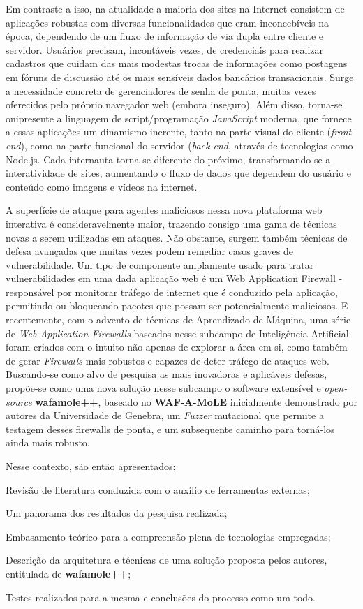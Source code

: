 Em contraste a isso, na atualidade a maioria dos sites na Internet consistem de aplicações robustas com diversas funcionalidades que eram inconcebíveis na época, dependendo de um fluxo de informação de via dupla entre cliente e servidor. Usuários precisam, incontáveis vezes, de credenciais para realizar cadastros que cuidam das mais modestas trocas de informações como postagens em fóruns de discussão até os mais sensíveis dados bancários transacionais. Surge a necessidade concreta de gerenciadores de senha de ponta, muitas vezes oferecidos pelo próprio navegador web (embora inseguro). Além disso, torna-se onipresente a linguagem de script/programação \textit{JavaScript} moderna, que fornece a essas aplicações um dinamismo inerente, tanto na parte visual do cliente (\textit{front-end}), como na parte funcional do servidor (\textit{back-end}, através de tecnologias como Node.js. Cada internauta torna-se diferente do próximo, transformando-se a interatividade de sites, aumentando o fluxo de dados que dependem do usuário e conteúdo como imagens e vídeos na internet.

A superfície de ataque para agentes maliciosos nessa nova plataforma web interativa é consideravelmente maior, trazendo consigo uma gama de técnicas novas a serem utilizadas em ataques. Não obstante, surgem também técnicas de defesa avançadas que muitas vezes podem remediar casos graves de vulnerabilidade. Um tipo de componente amplamente usado para tratar vulnerabilidades em uma dada aplicação web é um Web Application Firewall - responsável por monitorar tráfego de internet que é conduzido pela aplicação, permitindo ou bloqueando pacotes que possam ser potencialmente maliciosos. E recentemente, com o advento de técnicas de Aprendizado de Máquina, uma série de \textit{Web Application Firewalls}  baseados nesse subcampo de Inteligência Artificial foram criados com o intuito não apenas de explorar a área em si, como também de gerar \textit{Firewalls} mais robustos e capazes de deter tráfego de ataques web. Buscando-se como alvo de pesquisa as mais inovadoras e aplicáveis defesas, propõe-se como uma nova solução nesse subcampo o software extensível e \textit{open-source}  \textbf{wafamole++}, baseado no \textbf{WAF-A-MoLE} \cite{valenza_waf--mole_2020} inicialmente demonstrado por autores da Universidade de Genebra, um \textit{Fuzzer} mutacional que permite a testagem desses firewalls de ponta, e um subsequente caminho para torná-los ainda mais robusto.

Nesse contexto, são então apresentados: 
\begin{alineas}
\item Revisão de literatura conduzida com o auxílio de ferramentas externas;
\item Um panorama dos resultados da pesquisa realizada;
\item Embasamento teórico para a compreensão plena de tecnologias empregadas;
\item Descrição da arquitetura e técnicas de uma solução proposta pelos autores, entitulada de \textbf{wafamole++};
\item Testes realizados para a mesma e conclusões do processo como um todo.
\end{alineas}



